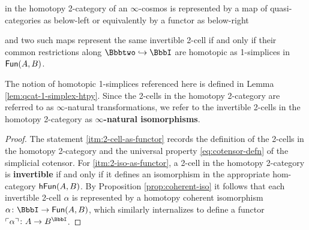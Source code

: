 \begin{lemma}
\begin{enumerate}
  in the homotopy 2-category of an $\infty$-cosmos is represented by a map of quasi-categories  as below-left or equivalently by a functor as below-right
  \begin{center}
  \end{center} and two such maps represent the same invertible 2-cell if and only if their common restrictions along $\cattwo \inc \iso$ are homotopic as 1-simplices in ${\mathord{\mathsf{Fun}}}(A,B)$.
  \end{enumerate}
  \end{lemma}

  The notion of homotopic 1-simplices referenced here is defined in Lemma \ref{lem:qcat-1-simplex-htpy}. Since the 2-cells in the homotopy 2-category are referred to as $\infty$-natural transformations, we refer to the invertible 2-cells in the homotopy 2-category as \textbf{$\infty$-natural isomorphisms}.

  \begin{proof}
  The statement \ref{itm:2-cell-as-functor} records the definition of the 2-cells in the homotopy 2-category and the universal property \eqref{eq:cotensor-defn} of the simplicial cotensor.  For \ref{itm:2-iso-as-functor}, a 2-cell in the homotopy 2-category is \textbf{invertible} if and only if it defines an isomorphism in the appropriate hom-category ${\mathord{\mathsf{hFun}}}(A,B)$. By Proposition \ref{prop:coherent-iso} it follows that each invertible 2-cell $\alpha$ is represented by a homotopy coherent isomorphism ${\alpha} \colon \iso \to \Fun(A,B)$, which similarly internalizes to define a functor $\name{\alpha} \colon A \to B^\iso$.
  \end{proof}



